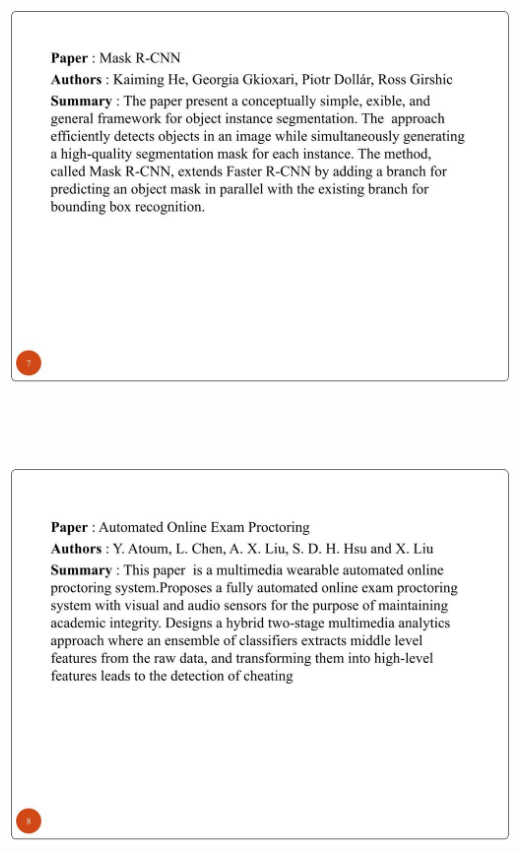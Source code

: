 \documentclass[12pt]{report}
\begin{document}
\includegraphics[width=17cm,height=12cm]{INTERNSHIP SAMPLE PRESENTATION (6)}\\
\includegraphics[width=17cm,height=12cm]{INTERNSHIP SAMPLE PRESENTATION (7)}\\
\end{document}
